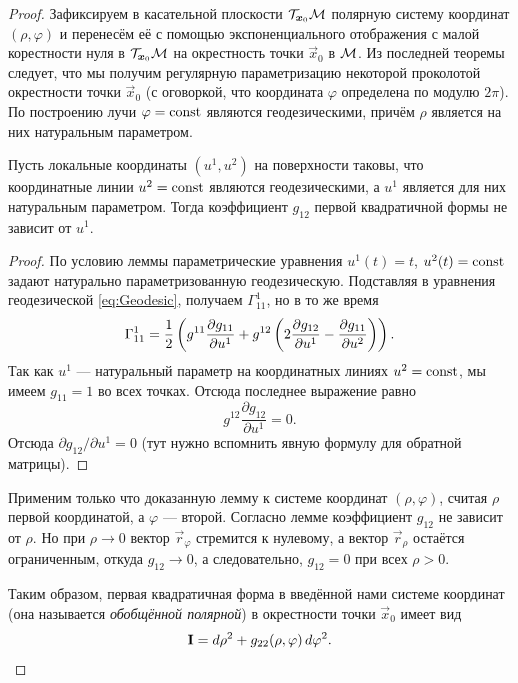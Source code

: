 \begin{proof}
	Зафиксируем в касательной плоскости $\mathcal{T}_{\boldsymbol{x}_0}\mathcal{M}$ полярную систему координат $(\rho, \varphi)$ и перенесём её с помощью экспоненциального отображения с малой корестности нуля в $\mathcal{T}_{\boldsymbol{x}_0}\mathcal{M}$ на окрестность точки $\vec{x}_0$ в $\mathcal{M}$. Из последней теоремы следует, что мы получим регулярную параметризацию некоторой проколотой окрестности точки $\vec{x}_0$ (с оговоркой, что координата $\varphi$ определена по модулю $2\pi$). По построению лучи $\varphi = \mathrm{const}$ являются геодезическими, причём $\rho$ является на них натуральным параметром.

	\begin{lemma} \label{lemma:g12}
		Пусть локальные координаты $(u^1, u^2)$ на поверхности таковы, что координатные линии $u^2 = \mathrm{const}$ являются геодезическими, а $u^1$ является для них натуральным параметром. Тогда коэффициент $g_{12}$ первой квадратичной формы не зависит от $u^1$.
	\end{lemma}

	\begin{proof}
		По условию леммы параметрические уравнения $u^1(t) = t$, $u^2(t) \hm= \const$ задают натурально параметризованную геодезическую. Подставляя в уравнения геодезической \eqref{eq:Geodesic}, получаем $\Gamma_{11}^1$, но в то же время
		\[
			\Gamma_{11}^1 = \frac{1}{2}\left(g^{11}\frac{\partial g_{11}}{\partial u^1} + g^{12}\left(2\frac{\partial g_{12}}{\partial u^1} - \frac{\partial g_{11}}{\partial u^2}\right)\right).
		\]
		Так как $u^1$ --- натуральный параметр на координатных линиях $u^2 = \mathrm{const}$, мы имеем $g_{11} = 1$ во всех точках. Отсюда последнее выражение равно
		\[
			g^{12}\frac{\partial g_{12}}{\partial u^1} = 0.
		\]
		Отсюда $\partial g_{12} / \partial u^1 = 0$ (тут нужно вспомнить явную формулу для обратной матрицы).
	\end{proof}

	Применим только что доказанную лемму к системе координат $(\rho, \varphi)$, считая $\rho$ первой координатой, а $\varphi$ --- второй. Согласно лемме коэффициент $g_{12}$ не зависит от $\rho$. Но при $\rho \to 0$ вектор $\vec{r}_\varphi$ стремится к нулевому, а вектор $\vec{r}_\rho$ остаётся ограниченным, откуда $g_{12} \to 0$, а следовательно, $g_{12} = 0$ при всех $\rho > 0$.

	Таким образом, первая квадратичная форма в введённой нами системе координат (она называется \textit{обобщённой полярной}) в окрестности точки $\vec{x}_0$ имеет вид
	\[
		\boldsymbol{\operatorname{I}} = d\rho^2 + g_{22}(\rho, \varphi)\,d\varphi^2.
	\]


\end{proof}
